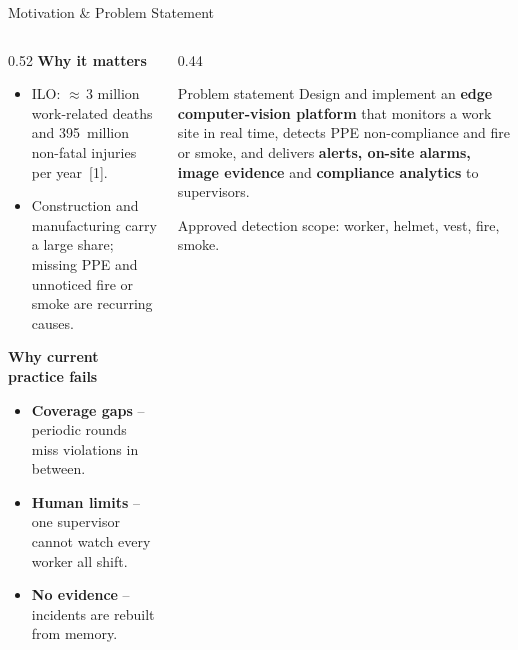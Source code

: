 \documentclass[aspectratio=169,10pt]{beamer}
\begin{document}
\begin{frame}{Motivation \& Problem Statement}
  \begin{columns}[T]
    \begin{column}{0.52\textwidth}
      \textbf{\small Why it matters}
      \begin{itemize}\footnotesize
        \item ILO: \alert{$\approx$\,3 million} work-related deaths and \alert{395~million}
              non-fatal injuries per year~[1].
        \item Construction and manufacturing carry a large share; missing PPE and unnoticed fire or
              smoke are recurring causes.
      \end{itemize}
      \vspace{0.2em}
      \textbf{\small Why current practice fails}
      \begin{itemize}\footnotesize
        \item \textbf{Coverage gaps} -- periodic rounds miss violations in between.
        \item \textbf{Human limits} -- one supervisor cannot watch every worker all shift.
        \item \textbf{No evidence} -- incidents are rebuilt from memory.
      \end{itemize}
    \end{column}
    \begin{column}{0.44\textwidth}
      \begin{block}{Problem statement}
        \small Design and implement an \textbf{edge computer-vision platform} that monitors a
        work site in real time, detects PPE non-compliance and fire or smoke, and delivers
        \textbf{alerts, on-site alarms, image evidence} and \textbf{compliance analytics} to
        supervisors.
      \end{block}
      \vspace{0.3em}
      {\scriptsize\color{slate} Approved detection scope: worker, helmet, vest, fire, smoke.\par}
    \end{column}
  \end{columns}
\end{frame}
\end{document}
